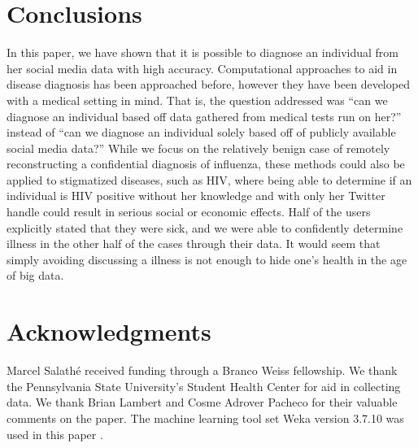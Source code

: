 \documentclass{acm_proc_article-sp}
\begin{document}
\section{Conclusions}


In this paper, we have shown that it is possible to diagnose an individual from her social media data with high accuracy. Computational approaches to aid in disease diagnosis has been approached before, however they have been developed with a medical setting in mind. That is, the question addressed was ``can we diagnose an individual based off data gathered from medical tests run on her?'' instead of ``can we diagnose an individual solely based off of publicly available social media data?''  While we focus on the relatively benign case of remotely reconstructing a confidential diagnosis of influenza, these methods could also be applied to stigmatized diseases, such as HIV, where being able to determine if an individual is HIV positive without her knowledge and with only her Twitter handle could result in serious social or economic effects. Half of the users explicitly stated that they were sick, and we were able to confidently determine illness in the other half of the cases through their data. It would seem that simply avoiding discussing a illness is not enough to hide one's health in the age of big data. 


\section{Acknowledgments}

Marcel Salath\'e received funding through a Branco Weiss fellowship. We thank the Pennsylvania State University's Student Health Center for aid in collecting data. We thank Brian Lambert and Cosme Adrover Pacheco for their valuable comments on the paper. The machine learning tool set Weka version 3.7.10 was used in this paper \cite{Hall:2009ud}.

\end{document}
